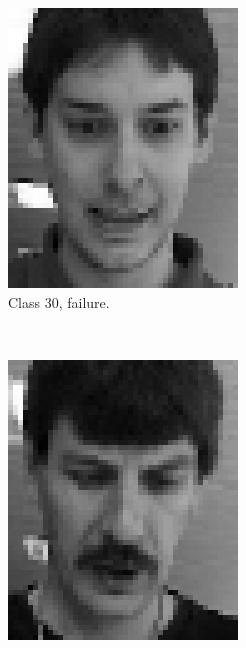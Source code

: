 \documentclass[a4paper, 10pt, conference]{ieeeconf}
\begin{document}
\begin{figure}[!ht]
\begin{subfigure}{0.125\textwidth}
          \includegraphics[width=\textwidth]{src/class2.png}
          \caption{Class 30, failure.}
        \end{subfigure}
        ~
        \begin{subfigure}{0.125\textwidth}
          \includegraphics[width=\textwidth]{src/class3.png}

\end{subfigure}
\end{figure}
\end{document}
